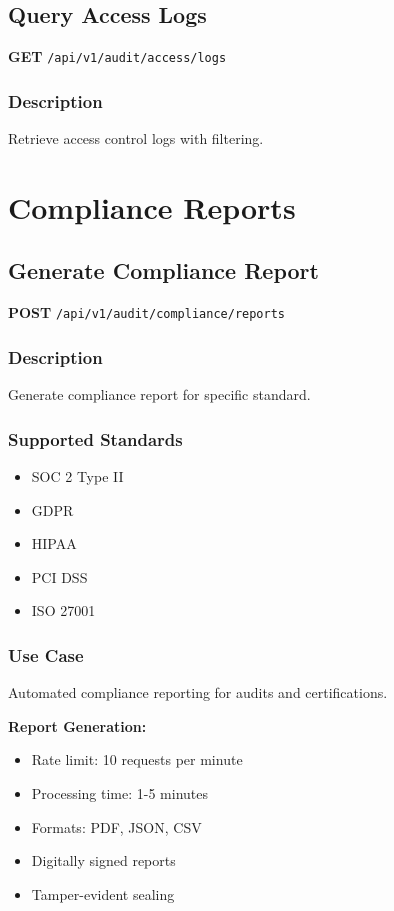 \documentclass[11pt,a4paper]{report}
\begin{document}
\subsection{Query Access Logs}

\textbf{GET} \texttt{/api/v1/audit/access/logs}

\subsubsection{Description}
Retrieve access control logs with filtering.

\section{Compliance Reports}

\subsection{Generate Compliance Report}

\textbf{POST} \texttt{/api/v1/audit/compliance/reports}

\subsubsection{Description}
Generate compliance report for specific standard.

\subsubsection{Supported Standards}
\begin{itemize}[leftmargin=*]
    \item SOC 2 Type II
    \item GDPR
    \item HIPAA
    \item PCI DSS
    \item ISO 27001
\end{itemize}

\subsubsection{Use Case}
Automated compliance reporting for audits and certifications.

\begin{infobox}
\textbf{Report Generation:}
\begin{itemize}[leftmargin=*]
    \item Rate limit: 10 requests per minute
    \item Processing time: 1-5 minutes
    \item Formats: PDF, JSON, CSV
    \item Digitally signed reports
    \item Tamper-evident sealing
\end{itemize}
\end{infobox}
\end{document}
